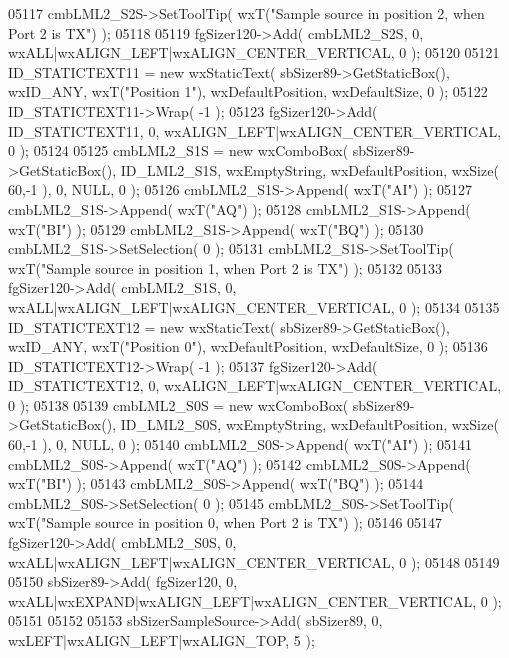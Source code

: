 \begin{DoxyCode}
05117     cmbLML2_S2S->SetToolTip( wxT(\textcolor{stringliteral}{"Sample source in position 2, when Port 2 is TX"}) );
05118     
05119     fgSizer120->Add( cmbLML2_S2S, 0, wxALL|wxALIGN\_LEFT|wxALIGN\_CENTER\_VERTICAL, 0 );
05120     
05121     ID_STATICTEXT11 = \textcolor{keyword}{new} wxStaticText( sbSizer89->GetStaticBox(), wxID\_ANY, wxT(\textcolor{stringliteral}{"Position 1"}), 
      wxDefaultPosition, wxDefaultSize, 0 );
05122     ID_STATICTEXT11->Wrap( -1 );
05123     fgSizer120->Add( ID_STATICTEXT11, 0, wxALIGN\_LEFT|wxALIGN\_CENTER\_VERTICAL, 0 );
05124     
05125     cmbLML2_S1S = \textcolor{keyword}{new} wxComboBox( sbSizer89->GetStaticBox(), ID_LML2_S1S, wxEmptyString, wxDefaultPosition,
       wxSize( 60,-1 ), 0, NULL, 0 );
05126     cmbLML2_S1S->Append( wxT(\textcolor{stringliteral}{"AI"}) );
05127     cmbLML2_S1S->Append( wxT(\textcolor{stringliteral}{"AQ"}) );
05128     cmbLML2_S1S->Append( wxT(\textcolor{stringliteral}{"BI"}) );
05129     cmbLML2_S1S->Append( wxT(\textcolor{stringliteral}{"BQ"}) );
05130     cmbLML2_S1S->SetSelection( 0 );
05131     cmbLML2_S1S->SetToolTip( wxT(\textcolor{stringliteral}{"Sample source in position 1, when Port 2 is TX"}) );
05132     
05133     fgSizer120->Add( cmbLML2_S1S, 0, wxALL|wxALIGN\_LEFT|wxALIGN\_CENTER\_VERTICAL, 0 );
05134     
05135     ID_STATICTEXT12 = \textcolor{keyword}{new} wxStaticText( sbSizer89->GetStaticBox(), wxID\_ANY, wxT(\textcolor{stringliteral}{"Position 0"}), 
      wxDefaultPosition, wxDefaultSize, 0 );
05136     ID_STATICTEXT12->Wrap( -1 );
05137     fgSizer120->Add( ID_STATICTEXT12, 0, wxALIGN\_LEFT|wxALIGN\_CENTER\_VERTICAL, 0 );
05138     
05139     cmbLML2_S0S = \textcolor{keyword}{new} wxComboBox( sbSizer89->GetStaticBox(), ID_LML2_S0S, wxEmptyString, wxDefaultPosition,
       wxSize( 60,-1 ), 0, NULL, 0 );
05140     cmbLML2_S0S->Append( wxT(\textcolor{stringliteral}{"AI"}) );
05141     cmbLML2_S0S->Append( wxT(\textcolor{stringliteral}{"AQ"}) );
05142     cmbLML2_S0S->Append( wxT(\textcolor{stringliteral}{"BI"}) );
05143     cmbLML2_S0S->Append( wxT(\textcolor{stringliteral}{"BQ"}) );
05144     cmbLML2_S0S->SetSelection( 0 );
05145     cmbLML2_S0S->SetToolTip( wxT(\textcolor{stringliteral}{"Sample source in position 0, when Port 2 is TX"}) );
05146     
05147     fgSizer120->Add( cmbLML2_S0S, 0, wxALL|wxALIGN\_LEFT|wxALIGN\_CENTER\_VERTICAL, 0 );
05148     
05149     
05150     sbSizer89->Add( fgSizer120, 0, wxALL|wxEXPAND|wxALIGN\_LEFT|wxALIGN\_CENTER\_VERTICAL, 0 );
05151     
05152     
05153     sbSizerSampleSource->Add( sbSizer89, 0, wxLEFT|wxALIGN\_LEFT|wxALIGN\_TOP, 5 );

\end{DoxyCode}
